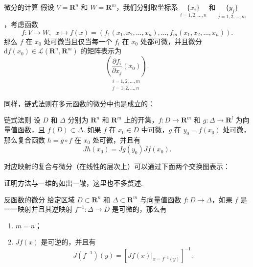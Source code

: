 \begin{theorem}{微分的计算}{}
    假设 $V = \mathbf{R}^n$ 和 $W = \mathbf{R}^m$，我们分别取坐标系 $\underset{i = 1, 2, \ldots, n}{\{x_i\}}$ 和 $\underset{j = 1, 2, \ldots, m}{\{y_j\}}$，考虑函数 \[f\colon V\to W,\enspace x\mapsto f(x) = (f_1(x_1, x_2, \ldots, x_n), \ldots, f_m(x_1, x_2, \ldots, x_n)).\]
    那么 $f$ 在 $x_0$ 处可微当且仅当每一个 $f_i$ 在 $x_0$ 处都可微，并且微分 $\mathrm{d}f(x_0)\in \mathcal{L}(\mathbf{R}^n, \mathbf{R}^m)$ 的矩阵表示为
    \[\underset{\substack{i = 1, 2, \ldots, m \\ j = 1, 2, \ldots, n}}{\left(\frac{\partial f_i}{\partial x_j}(x_0)\right)}.\]
\end{theorem}

同样，链式法则在多元函数的微分中也是成立的：

\begin{theorem}{链式法则}{}
    设 $D$ 和 $\Delta$ 分别为 $\mathbf{R}^n$ 和 $\mathbf{R}^m$ 上的开集，$f\colon D\to \mathbf{R}^m$ 和 $g\colon \Delta\to \mathbf{R}^l$ 为向量值函数，且 $f(D)\subset \Delta$. 如果 $f$ 在 $x_0\in D$ 中可微，$g$ 在 $y_0 = f(x_0)$ 处可微，那么复合函数 $h = g\circ f$ 在 $x_0$ 处可微，并且有\[Jh(x_0) = Jg(y_0)Jf(x_0).\]

    对应映射的复合与微分（在线性的层次上）可以通过下面两个交换图表示：
    \begin{center}
        \qquad
    \end{center}
\end{theorem}

证明方法与一维的如出一辙，这里也不多赘述.

\begin{corollary}{反函数的微分}{}
    给定区域 $D\subset \mathbf{R}^n$ 和 $\Delta \subset \mathbf{R}^m$ 与向量值函数 $f\colon D\to \Delta$，如果 $f$ 是一一映射并且其逆映射 $f^{-1}\colon \Delta\to D$ 是可微的，那么有
    \begin{enumerate}[label=(\arabic*)]
        \item $m = n$；
        \item $Jf(x)$ 是可逆的，并且有 \[J(f^{-1})(y) = [\left.Jf(x)\right|_{x = f^{-1}(y)}]^{-1}.\]
    \end{enumerate}
\end{corollary}

